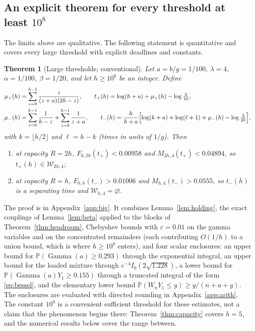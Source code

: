\documentclass[11pt,a4paper]{article}
\theoremstyle{plain}
\newtheorem{theorem}{Theorem}[section]
\theoremstyle{definition}
\theoremstyle{remark}
\newcommand{\Prob}{\mathbb P}
\newcommand{\Wc}{\mathcal W}
\newcommand{\eps}{\varepsilon}
\DeclareMathOperator{\Gam}{Gamma}
\begin{document}
\subsection{An explicit theorem for every threshold at least \texorpdfstring{$10^{8}$}{1e8}}
The limits above are qualitative. The following statement is quantitative and covers every large threshold with explicit deadlines and constants.

\begin{theorem}[Large thresholds; conventional]\label{thm:big}
Let $a=b/g=1/100$, $\lambda=4$, $\alpha=1/100$, $\beta=1/20$, and let $h\ge10^{8}$ be an integer. Define
\begin{align}
\mu_+(h)&=\sum_{z=0}^{h-1}\frac{z}{(z+a)(2h-z)},\qquad t_+(h)=\log(h+a)+\mu_+(h)-\log\tfrac{3}{10},\label{eq:tplus}\\
\mu_-(h)&=\sum_{z=0}^{k-1}\frac1{h-z}+\sum_{z=k}^{h-1}\frac1{z+a},\qquad
t_-(h)=\frac{h}{h+a}\Bigl[\log(k+a)+\log(\ell+1)+\mu_-(h)-\log\tfrac{3}{20}\Bigr],\label{eq:tminus}
\end{align}
with $k=\lfloor h/2\rfloor$ and $\ell=h-k$ (times in units of $1/g$). Then
\begin{enumerate}[label=(\alph*)]
\item at capacity $R=2h$, $F_{0,2h}(t_+)<0.00958$ and $M_{2h,4}(t_+)<0.04894$, so $t_+(h)\in\Wc_{2h,4}$;
\item at capacity $R=h$, $F_{0,h}(t_-)>0.01006$ and $M_{h,4}(t_-)>0.0555$, so $t_-(h)$ is a separating time and $\Wc_{h,4}=\varnothing$.
\end{enumerate}
\end{theorem}
The proof is in Appendix~\ref{app:big}. It combines Lemma~\ref{lem:holding}, the exact couplings of Lemma~\ref{lem:beta} applied to the blocks of Theorem~\ref{thm:headroom}, Chebyshev bounds with $\eps=0.01$ on the gamma variables and on the concentrated remainders (each contributing $O(1/h)$ to a union bound, which is where $h\ge10^{8}$ enters), and four scalar enclosures: an upper bound for $\Prob(\Gam(a)\ge0.293)$ through the exponential integral, an upper bound for the loaded mixture through $e^{-4}I_0(2\sqrt{1.228})$, a lower bound for $\Prob(\Gam(a)Y_1\ge0.155)$ through a truncated integral of the form \eqref{eq:bessel}, and the elementary lower bound $\Prob(W_nY_1\le y)\ge y/(n+a+y)$. The enclosures are evaluated with directed rounding in Appendix~\ref{app:arith}. The constant $10^{8}$ is a convenient sufficient threshold for these estimates, not a claim that the phenomenon begins there: Theorem~\ref{thm:capacity} covers $h=5$, and the numerical results below cover the range between.
\end{document}
